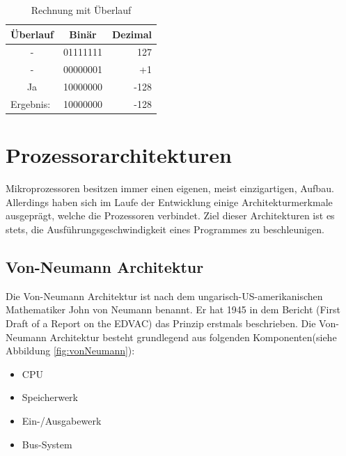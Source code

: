 \documentclass[12pt]{article}
\begin{document}
\begin{table}[!htb]
\centering
\caption{Rechnung mit Überlauf}
\label{my-label}
\begin{tabular}{|c|r|r|}
\hline
\textbf{Überlauf}               & \multicolumn{1}{c|}{\textbf{Binär}} & \multicolumn{1}{c|}{\textbf{Dezimal}} \\ \hline
-                               & 01111111                            & 127                                   \\ \hline
-                               & 00000001                            & +1                                    \\ \hline
Ja                              & 10000000                            & -128                                  \\ \hline\hline
\multicolumn{1}{|l|}{Ergebnis:} & 10000000                            & -128                                  \\ \hline
\end{tabular}
\end{table}

\section{Prozessorarchitekturen}
Mikroprozessoren besitzen immer einen eigenen, meist einzigartigen, Aufbau. Allerdings haben sich im Laufe der Entwicklung einige Architekturmerkmale ausgeprägt, welche die Prozessoren verbindet. 
Ziel dieser Architekturen ist es stets, die Ausführungsgeschwindigkeit eines Programmes zu beschleunigen.
\subsection{Von-Neumann Architektur}
Die Von-Neumann Architektur ist nach dem ungarisch-US-amerikanischen Mathematiker John von Neumann benannt. Er hat 1945 in dem Bericht (First Draft of a Report on the EDVAC) das Prinzip erstmals beschrieben.
Die Von-Neumann Architektur besteht grundlegend aus folgenden Komponenten(siehe Abbildung \ref{fig:vonNeumann}):
\begin{itemize}
\item CPU 
\item Speicherwerk 
\item Ein-/Ausgabewerk
\item Bus-System
\end{itemize}
\end{document}
